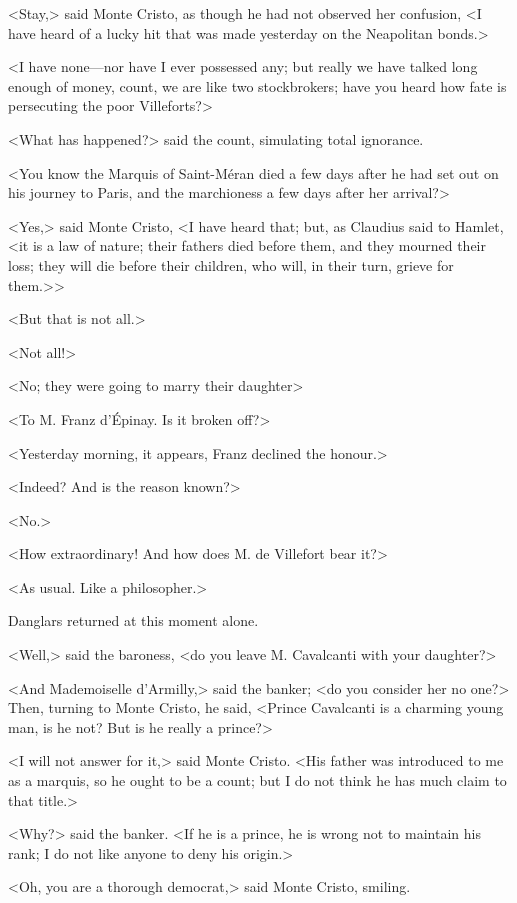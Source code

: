  <Stay,> said Monte Cristo, as though he had not observed her confusion, <I have heard of a lucky hit that was made yesterday on the Neapolitan bonds.> 

 <I have none—nor have I ever possessed any; but really we have talked long enough of money, count, we are like two stockbrokers; have you heard how fate is persecuting the poor Villeforts?> 

 <What has happened?> said the count, simulating total ignorance. 

 <You know the Marquis of Saint-Méran died a few days after he had set out on his journey to Paris, and the marchioness a few days after her arrival?> 

 <Yes,> said Monte Cristo, <I have heard that; but, as Claudius said to Hamlet, <it is a law of nature; their fathers died before them, and they mourned their loss; they will die before their children, who will, in their turn, grieve for them.>> 

 <But that is not all.> 

 <Not all!> 

 <No; they were going to marry their daughter\longdash> 

 <To M. Franz d'Épinay. Is it broken off?> 

 <Yesterday morning, it appears, Franz declined the honour.> 

 <Indeed? And is the reason known?> 

 <No.> 

 <How extraordinary! And how does M. de Villefort bear it?> 

 <As usual. Like a philosopher.> 

 Danglars returned at this moment alone. 

 <Well,> said the baroness, <do you leave M. Cavalcanti with your daughter?> 

 <And Mademoiselle d'Armilly,> said the banker; <do you consider her no one?> Then, turning to Monte Cristo, he said, <Prince Cavalcanti is a charming young man, is he not? But is he really a prince?> 

 <I will not answer for it,> said Monte Cristo. <His father was introduced to me as a marquis, so he ought to be a count; but I do not think he has much claim to that title.> 

 <Why?> said the banker. <If he is a prince, he is wrong not to maintain his rank; I do not like anyone to deny his origin.> 

 <Oh, you are a thorough democrat,> said Monte Cristo, smiling. 

